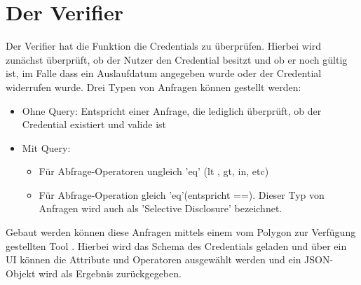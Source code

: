 \section{Der Verifier}
Der Verifier hat die Funktion die Credentials zu überprüfen. Hierbei wird zunächst überprüft, ob der Nutzer den Credential besitzt und ob er noch gültig ist, im Falle dass ein Auslaufdatum angegeben wurde oder der Credential widerrufen wurde. Drei Typen von Anfragen können gestellt werden:
\begin{itemize}
	\item Ohne Query: Entspricht einer Anfrage, die lediglich überprüft, ob der Credential existiert und valide ist
	\item Mit Query:
		\begin{itemize}
			\item Für Abfrage-Operatoren ungleich 'eq' (lt , gt, in, etc)
			\item Für Abfrage-Operation gleich 'eq'(entspricht ==). Dieser Typ von Anfragen wird auch als 'Selective Disclosure' bezeichnet.
		\end{itemize}
\end{itemize}
Gebaut werden können diese Anfragen mittels einem vom Polygon zur Verfügung gestellten Tool \cite{ID57}. Hierbei wird das Schema des Credentials geladen und über ein UI können die Attribute und Operatoren ausgewählt werden und ein JSON-Objekt wird als Ergebnis zurückgegeben.

